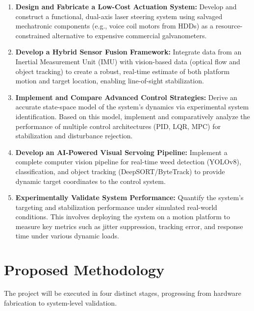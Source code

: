 \documentclass[12pt]{article}
\begin{document}
\begin{enumerate}
    \item \textbf{Design and Fabricate a Low-Cost Actuation System:} Develop and construct a functional, dual-axis laser steering system using salvaged mechatronic components (e.g., voice coil motors from HDDs) as a resource-constrained alternative to expensive commercial galvanometers.

    \item \textbf{Develop a Hybrid Sensor Fusion Framework:} Integrate data from an Inertial Measurement Unit (IMU) with vision-based data (optical flow and object tracking) to create a robust, real-time estimate of both platform motion and target location, enabling line-of-sight stabilization.

    \item \textbf{Implement and Compare Advanced Control Strategies:} Derive an accurate state-space model of the system's dynamics via experimental system identification. Based on this model, implement and comparatively analyze the performance of multiple control architectures (PID, LQR, MPC) for stabilization and disturbance rejection.

    \item \textbf{Develop an AI-Powered Visual Servoing Pipeline:} Implement a complete computer vision pipeline for real-time weed detection (YOLOv8), classification, and object tracking (DeepSORT/ByteTrack) to provide dynamic target coordinates to the control system.

    \item \textbf{Experimentally Validate System Performance:} Quantify the system's targeting and stabilization performance under simulated real-world conditions. This involves deploying the system on a motion platform to measure key metrics such as jitter suppression, tracking error, and response time under various dynamic loads.
\end{enumerate}

\section{Proposed Methodology}

The project will be executed in four distinct stages, progressing from hardware fabrication to system-level validation.
\end{document}
